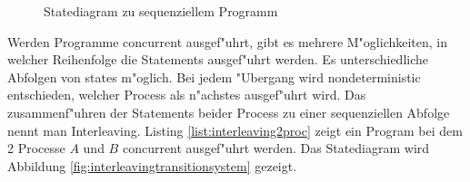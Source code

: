 \documentclass[11pt,twoside,a4paper]{article}
\begin{document}
\begin{figure}
  \centering
   
  \label{fig:interleavinglisting}
\end{figure}

\begin{figure}
  \centering
  \caption{Statediagram zu sequenziellem Programm}
  \label{fig:sequencielstatediagram}
\end{figure}

Werden Programme concurrent ausgef"uhrt, gibt es mehrere M"oglichkeiten, in welcher Reihenfolge die Statements ausgef"uhrt werden. Es unterschiedliche Abfolgen von states m"oglich. Bei jedem "Ubergang wird nondeterministic entschieden, welcher Process als n"achstes ausgef"uhrt wird. Das zusammenf"uhren der Statements beider Process zu einer sequenziellen Abfolge nennt man Interleaving.  Listing \ref{list:interleaving2proc} zeigt ein Program bei dem 2 Processe $A$ und $B$ concurrent ausgef"uhrt werden. Das Statediagram wird Abbildung \ref{fig:interleavingtransitionsystem} gezeigt.

\begin{figure}
  \centering
  
\end{figure}
\end{document}
